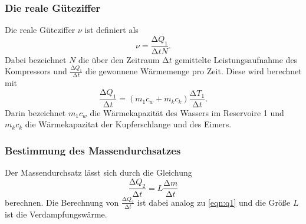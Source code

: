 \subsubsection{Die reale Güteziffer}
Die reale Güteziffer $\nu$ ist definiert als
\begin{equation}
  \nu = \frac{\increment Q_1}{\increment t N}.
  \label{eqn:realGüte}
\end{equation}
Dabei bezeichnet $N$ die über den Zeitraum $\increment t $ gemittelte
Leistungsaufnahme des Kompressors und $\frac{\increment Q_1}{\increment t }$
die gewonnene Wärmemenge pro Zeit. Diese wird berechnet mit
\begin{equation}
  \frac{\increment Q_1}{\increment t} =(m_1 c_w + m_k c_k)
  \frac{\increment T_1}{\increment t}.
  \label{eqn:q1}
\end{equation}
Darin bezeichnet $m_1c_w$ die Wärmekapazität des Wassers im Reservoire 1 und
$m_kc_k$ die Wärmekapazitat der Kupferschlange und des Eimers.
\subsubsection{Bestimmung des Massendurchsatzes}
Der Massendurchsatz lässt sich durch die Gleichung
\begin{equation}
  \frac{\increment Q_2}{\increment t} = L \frac{\increment m}{\increment t}
\end{equation}
berechnen. Die Berechnung von $\frac{\increment Q_2}{\increment t}$ ist dabei
analog zu \eqref{eqn:q1} und die Größe $L$ ist die Verdampfungswärme.
